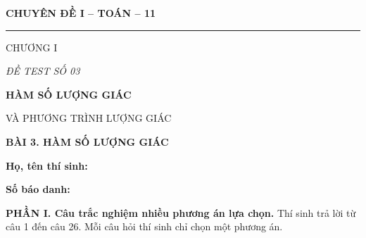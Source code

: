 \documentclass[12pt,a4paper]{article}
\begin{document}
\noindent
\begin{minipage}[t]{.35\textwidth}
  \centering
  {\bfseries CHUYÊN ĐỀ I -- TOÁN -- 11\par}
  \vspace{2pt}\rule{.72\linewidth}{.4pt}\par
  \vspace{3pt} CHƯƠNG I\par
  \vspace{4pt} {\itshape ĐỀ TEST SỐ 03\par}
\end{minipage}\hfill
\begin{minipage}[t]{.62\textwidth}
  \centering
  {\bfseries HÀM SỐ LƯỢNG GIÁC\par
  VÀ PHƯƠNG TRÌNH LƯỢNG GIÁC\par}
  \vspace{5pt}
  {\small\bfseries BÀI 3. HÀM SỐ LƯỢNG GIÁC\par}
\end{minipage}

\vspace{7mm}
\noindent
\begin{minipage}[t]{.72\textwidth}
  \textbf{Họ, tên thí sinh:}\dotfill\par
  \vspace{3pt}\textbf{Số báo danh:}\dotfill
\end{minipage}\hfill
\begin{minipage}[t]{.25\textwidth}
  \raggedleft\setlength{\fboxsep}{4pt}
\end{minipage}

\vspace{5mm}
\textbf{PHẦN I. Câu trắc nghiệm nhiều phương án lựa chọn.}
Thí sinh trả lời từ câu 1 đến câu 26. Mỗi câu hỏi thí sinh chỉ chọn một phương án.
\end{document}
